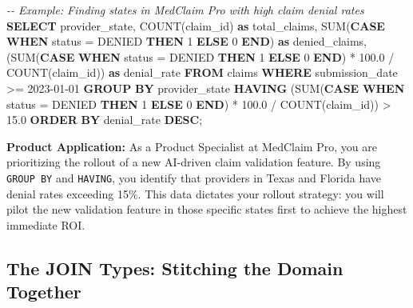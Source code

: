 \documentclass[
  11pt,
  openany,
  oneside]{book}
\newenvironment{Shaded}{}{}
\newcommand{\CommentTok}[1]{\textcolor[rgb]{0.38,0.63,0.69}{\textit{#1}}}
\newcommand{\ControlFlowTok}[1]{\textcolor[rgb]{0.00,0.44,0.13}{\textbf{#1}}}
\newcommand{\DecValTok}[1]{\textcolor[rgb]{0.25,0.63,0.44}{#1}}
\newcommand{\FloatTok}[1]{\textcolor[rgb]{0.25,0.63,0.44}{#1}}
\newcommand{\FunctionTok}[1]{\textcolor[rgb]{0.02,0.16,0.49}{#1}}
\newcommand{\KeywordTok}[1]{\textcolor[rgb]{0.00,0.44,0.13}{\textbf{#1}}}
\newcommand{\NormalTok}[1]{#1}
\newcommand{\OperatorTok}[1]{\textcolor[rgb]{0.40,0.40,0.40}{#1}}
\newcommand{\StringTok}[1]{\textcolor[rgb]{0.25,0.44,0.63}{#1}}
\begin{document}
\begin{Shaded}
\begin{Highlighting}[]
\CommentTok{{-}{-} Example: Finding states in MedClaim Pro with high claim denial rates}
\KeywordTok{SELECT} 
\NormalTok{    provider\_state, }
    \FunctionTok{COUNT}\NormalTok{(claim\_id) }\KeywordTok{as}\NormalTok{ total\_claims,}
    \FunctionTok{SUM}\NormalTok{(}\ControlFlowTok{CASE} \ControlFlowTok{WHEN}\NormalTok{ status }\OperatorTok{=} \StringTok{\textquotesingle{}DENIED\textquotesingle{}} \ControlFlowTok{THEN} \DecValTok{1} \ControlFlowTok{ELSE} \DecValTok{0} \ControlFlowTok{END}\NormalTok{) }\KeywordTok{as}\NormalTok{ denied\_claims,}
\NormalTok{    (}\FunctionTok{SUM}\NormalTok{(}\ControlFlowTok{CASE} \ControlFlowTok{WHEN}\NormalTok{ status }\OperatorTok{=} \StringTok{\textquotesingle{}DENIED\textquotesingle{}} \ControlFlowTok{THEN} \DecValTok{1} \ControlFlowTok{ELSE} \DecValTok{0} \ControlFlowTok{END}\NormalTok{) }\OperatorTok{*} \FloatTok{100.0} \OperatorTok{/} \FunctionTok{COUNT}\NormalTok{(claim\_id)) }\KeywordTok{as}\NormalTok{ denial\_rate}
\KeywordTok{FROM}\NormalTok{ claims}
\KeywordTok{WHERE}\NormalTok{ submission\_date }\OperatorTok{\textgreater{}=} \StringTok{\textquotesingle{}2023{-}01{-}01\textquotesingle{}}
\KeywordTok{GROUP} \KeywordTok{BY}\NormalTok{ provider\_state}
\KeywordTok{HAVING}\NormalTok{ (}\FunctionTok{SUM}\NormalTok{(}\ControlFlowTok{CASE} \ControlFlowTok{WHEN}\NormalTok{ status }\OperatorTok{=} \StringTok{\textquotesingle{}DENIED\textquotesingle{}} \ControlFlowTok{THEN} \DecValTok{1} \ControlFlowTok{ELSE} \DecValTok{0} \ControlFlowTok{END}\NormalTok{) }\OperatorTok{*} \FloatTok{100.0} \OperatorTok{/} \FunctionTok{COUNT}\NormalTok{(claim\_id)) }\OperatorTok{\textgreater{}} \FloatTok{15.0}
\KeywordTok{ORDER} \KeywordTok{BY}\NormalTok{ denial\_rate }\KeywordTok{DESC}\NormalTok{;}
\end{Highlighting}
\end{Shaded}

\textbf{Product Application:} As a Product Specialist at MedClaim Pro,
you are prioritizing the rollout of a new AI-driven claim validation
feature. By using \texttt{GROUP\ BY} and \texttt{HAVING}, you identify
that providers in Texas and Florida have denial rates exceeding 15\%.
This data dictates your rollout strategy: you will pilot the new
validation feature in those specific states first to achieve the highest
immediate ROI.

\subsection{The JOIN Types: Stitching the Domain
Together}\label{the-join-types-stitching-the-domain-together}
\end{document}
